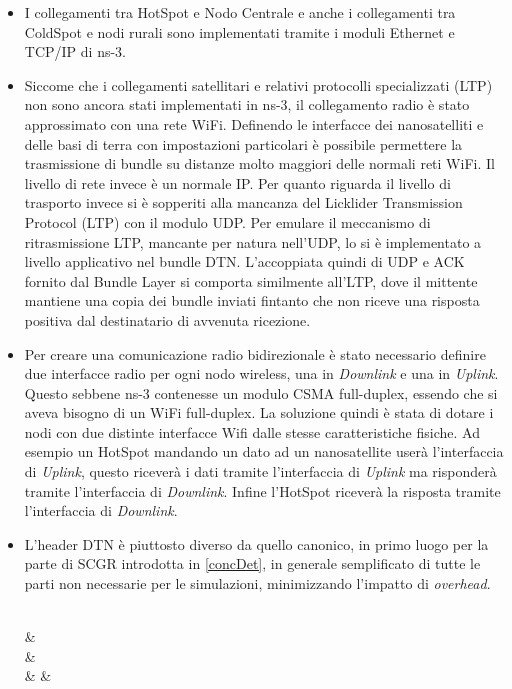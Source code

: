 \documentclass[12pt,a4paper,oneside]{book}
\begin{document}
		\begin{itemize}
			\item I collegamenti tra HotSpot e Nodo Centrale e anche i collegamenti tra ColdSpot e nodi rurali sono implementati tramite i moduli Ethernet e TCP/IP di ns-3.
			
			\item Siccome che i collegamenti satellitari e relativi protocolli specializzati (LTP) non sono ancora stati implementati in ns-3, il collegamento radio è stato approssimato con una rete WiFi. Definendo le interfacce dei nanosatelliti e delle basi di terra con impostazioni particolari è possibile permettere la trasmissione di bundle su distanze molto maggiori delle normali reti WiFi. Il livello di rete invece è un normale IP. Per quanto riguarda il livello di trasporto invece si è sopperiti alla mancanza del Licklider Transmission Protocol (LTP) con il modulo UDP. Per emulare il meccanismo di ritrasmissione LTP, mancante per natura nell'UDP, lo si è implementato a livello applicativo nel bundle DTN. L'accoppiata quindi di UDP e ACK fornito dal Bundle Layer si comporta similmente all'LTP, dove il mittente mantiene una copia dei bundle inviati fintanto che non riceve una risposta positiva dal destinatario di avvenuta ricezione. 
			
			\item Per creare una comunicazione radio bidirezionale è stato necessario definire due interfacce radio per ogni nodo wireless, una in {\it Downlink} e una in {\it Uplink}. Questo sebbene ns-3 contenesse un modulo CSMA full-duplex, essendo che si aveva bisogno di un WiFi full-duplex. La soluzione quindi è stata di dotare i nodi con due distinte interfacce Wifi dalle stesse caratteristiche fisiche. Ad esempio un HotSpot mandando un dato ad un nanosatellite userà l'interfaccia di {\it Uplink}, questo riceverà i dati tramite l'interfaccia di {\it Uplink} ma risponderà tramite l'interfaccia di {\it Downlink}. Infine l'HotSpot riceverà la risposta tramite l'interfaccia di {\it Downlink}.
		
			\item L'header DTN è piuttosto diverso da quello canonico, in primo luogo per la parte di SCGR introdotta in \ref{concDet}, in generale semplificato di tutte le parti non necessarie per le simulazioni, minimizzando l'impatto di {\it overhead}.
			
			\vspace{25pt}
			\begin{bytefield}[bitwidth=0.5em]{64}
				 \\
				  &  \\
				 &  \\
				 &  &  \\
				

\end{bytefield}
\end{itemize}
\end{document}
